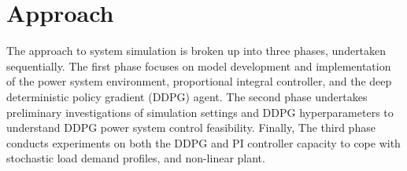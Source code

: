 \chapter{Approach}
The approach to system simulation is broken up into three phases, undertaken sequentially. The first phase focuses on model development and implementation of the power system environment, proportional integral controller, and the deep deterministic policy gradient (DDPG) agent. The second phase undertakes preliminary investigations of simulation settings and DDPG hyperparameters to understand DDPG power system control feasibility. Finally, The third phase conducts experiments on both the DDPG and PI controller capacity to cope with stochastic load demand profiles, and non-linear plant.









